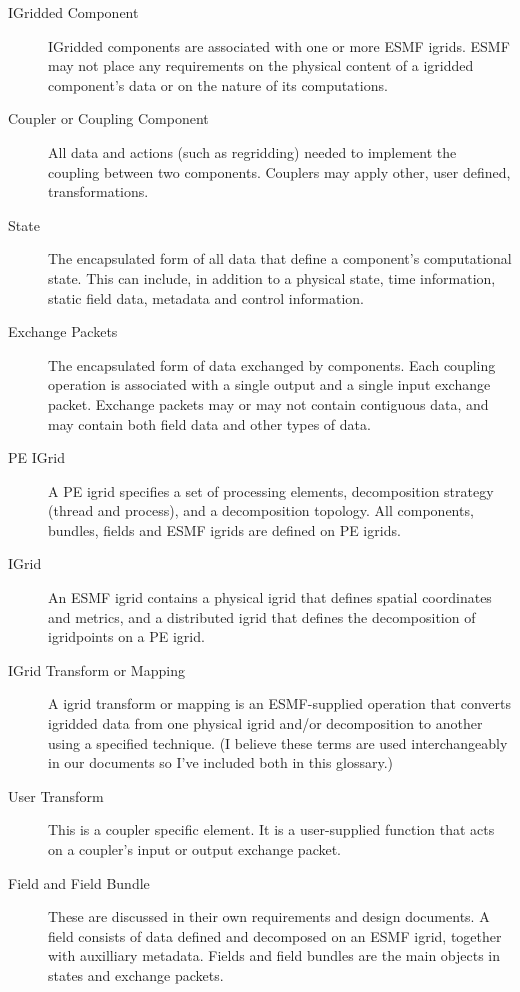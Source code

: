 
\begin{description}

\item [IGridded Component] \label{glos:GC}
IGridded components are associated with one or more ESMF 
igrids.  ESMF may not place any requirements  on the physical content of a
igridded component's data or on the nature of its computations. 

\item [Coupler or Coupling Component] \label{glos:Cplr}
All data and actions (such as regridding) needed to implement the
coupling between two components.  Couplers may apply other, user 
defined, transformations. 

\item [State] \label{glos:State} The encapsulated form of all data that
define a component's computational state. This can include,
in addition to a physical state,  time information, static field data,
metadata and control information. 

\item [Exchange Packets] \label{glos:EP} The encapsulated form of 
data exchanged by components.  Each coupling operation is 
associated with a single output and a single input exchange packet.
Exchange packets may or may not contain contiguous data, and may 
contain both field data and other types of data.

\item [PE IGrid] \label{glos:PEIGrid} A PE igrid specifies a set of 
processing elements, decomposition strategy (thread and process), and 
a decomposition topology.  All components, bundles, fields and ESMF
igrids are defined on PE igrids.

\item [IGrid] An ESMF igrid contains a physical igrid 
that defines spatial coordinates and metrics, and a distributed igrid that 
defines the decomposition of igridpoints on a PE igrid.

\item [IGrid Transform or Mapping] \label{glos:GrdTrans} A igrid transform 
or mapping is an ESMF-supplied operation that converts igridded data 
from one physical igrid and/or decomposition to another using a specified 
technique.  (I believe these terms are used interchangeably in our documents 
so I've included both in this glossary.)

\item [User Transform] \label{glos:UsrTrans} This is a coupler specific
element. It is a user-supplied function that acts on a coupler's
input or output exchange packet.

\item [Field and Field Bundle] These are discussed in their own 
requirements and design documents. A field consists of data defined 
and decomposed on an ESMF igrid, together with auxilliary metadata. 
Fields and field bundles are the main objects in states and exchange 
packets.

\end{description}




